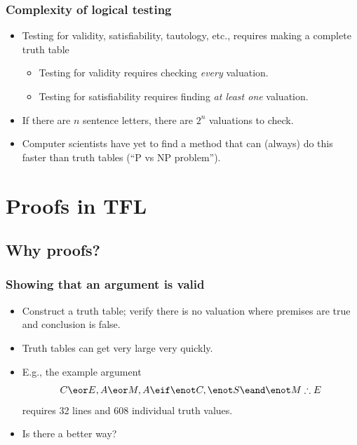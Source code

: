 \begin{frame}
\frametitle{Complexity of logical testing}

\begin{itemize}[<+->]
\item Testing for validity, satisfiability, tautology, etc., requires
making a complete truth table
\begin{itemize}
\item Testing for validity requires checking \emph{every} valuation.
\item Testing for satisfiability requires finding \emph{at least one} valuation.
\end{itemize}
\item If there are $n$ sentence letters, there are $2^n$ valuations to
check.
\item Computer scientists have yet to find a method that can (always) do this
faster than truth tables (``P vs NP problem'').
\end{itemize}
\end{frame}


\newhourlecture
\newonlinelecture

\section{Proofs in TFL}

\subsection{Why proofs?}

\begin{frame}
  \frametitle{Showing that an argument is valid}

  \begin{itemize}[<+->]
    \item Construct a truth table; verify there is no valuation where
    premises are true and conclusion is false.
    \item Truth tables can get very large very quickly.
    \item E.g., the example argument
      \[
      C \eor E, A \eor M, A \eif \enot C, \enot S \eand \enot M \therefore E
      \]
      requires 32 lines and 608 individual truth values.
    \item Is there a better way?
  \end{itemize}
\end{frame}

